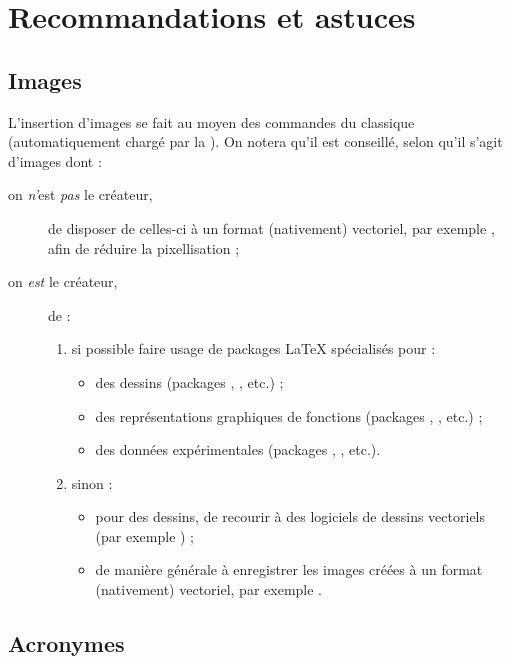 \chapter{Recommandations et astuces}
\label{cha-recomm-et-astuc}

\section{Images}

L'insertion d'images se fait au moyen des commandes du classique
 (automatiquement chargé par la \yatCl{}). On notera qu'il
est conseillé, selon qu'il s'agit d'images dont :
\begin{description}
\item[on \emph{n'}est \emph{pas} le créateur,] de disposer de celles-ci à un
  format (nativement) vectoriel, par exemple \pdf{}, afin de réduire la
  pixellisation ;
\item[on \emph{est} le créateur,] de :
  \begin{enumerate}
  \item si possible faire usage de packages \LaTeX{} spécialisés pour :
    \begin{itemize}
    \item des dessins (packages , , etc.) ;
    \item des représentations graphiques de fonctions (packages
      , , etc.) ;
    \item des données expérimentales (packages ,
      , etc.).
    \end{itemize}
  \item sinon :
    \begin{itemize}
    \item pour des dessins, de recourir à des logiciels de dessins vectoriels
      (par exemple \href{https://inkscape.org/}{}) ;
    \item de manière générale à enregistrer les images créées à un format
      (nativement) vectoriel, par exemple \pdf{}.
    \end{itemize}
  \end{enumerate}
\end{description}

\section{Acronymes}\label{acronymes}

